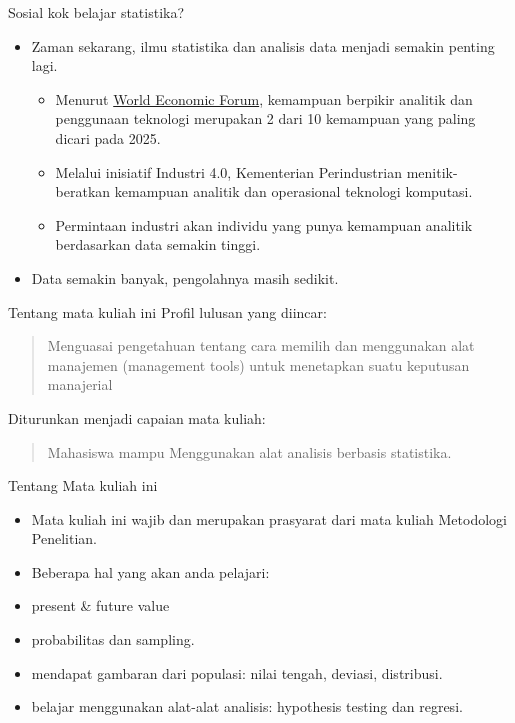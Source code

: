 \documentclass[
  ignorenonframetext,
]{beamer}
\begin{document}
\begin{frame}{Sosial kok belajar statistika?}
\label{sosial-kok-belajar-statistika-1}
\begin{itemize}
\item
  Zaman sekarang, ilmu statistika dan analisis data menjadi semakin
  penting lagi.

  \begin{itemize}
  \item
    Menurut
    \href{https://www.weforum.org/agenda/2020/10/top-10-work-skills-of-tomorrow-how-long-it-takes-to-learn-them/}{World
    Economic Forum}, kemampuan berpikir analitik dan penggunaan
    teknologi merupakan 2 dari 10 kemampuan yang paling dicari pada
    2025.
  \item
    Melalui inisiatif Industri 4.0, Kementerian Perindustrian
    menitik-beratkan kemampuan analitik dan operasional teknologi
    komputasi.
  \item
    Permintaan industri akan individu yang punya kemampuan analitik
    berdasarkan data semakin tinggi.
  \end{itemize}
\item
  Data semakin banyak, pengolahnya masih sedikit.
\end{itemize}
\end{frame}

\begin{frame}{Tentang mata kuliah ini}
\label{tentang-mata-kuliah-ini}
Profil lulusan yang diincar:

\begin{quote}
Menguasai pengetahuan tentang cara memilih dan menggunakan alat
manajemen (management tools) untuk menetapkan suatu keputusan manajerial
\end{quote}

Diturunkan menjadi capaian mata kuliah:

\begin{quote}
Mahasiswa mampu Menggunakan alat analisis berbasis statistika.
\end{quote}
\end{frame}

\begin{frame}{Tentang Mata kuliah ini}
\label{tentang-mata-kuliah-ini-1}
\begin{itemize}
\item
  Mata kuliah ini wajib dan merupakan prasyarat dari mata kuliah
  Metodologi Penelitian.
\item
  Beberapa hal yang akan anda pelajari:
\end{itemize}

\begin{itemize}[<+->]
\item
  present \& future value
\item
  probabilitas dan sampling.
\item
  mendapat gambaran dari populasi: nilai tengah, deviasi, distribusi.
\item
  belajar menggunakan alat-alat analisis: hypothesis testing dan
  regresi.
\end{itemize}
\end{frame}
\end{document}
